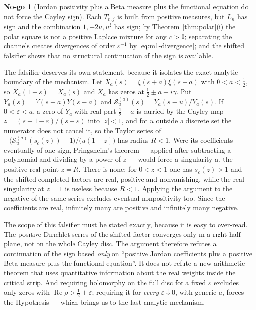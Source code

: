 \documentclass[11pt]{amsart}
\theoremstyle{definition}
\theoremstyle{remark}
\theoremstyle{definition}
\newtheorem{nogo}{No-go}[section]
\renewcommand{\Re}{\operatorname{Re}}
\newcommand{\half}{\tfrac{1}{2}}
\newcommand{\gam}{\gamma}
\newcommand{\eps}{\varepsilon}
\begin{document}
\begin{nogo}[Jordan positivity plus a Beta measure plus the functional equation do not force the
Cayley sign]\label{ng:three}
Each $T_{n,j}$ is built from positive measures, but $L_n$ has sign and the combination
$1,-2u,u^2$ has sign; by Theorem~\ref{thm:polar}(i) the polar square is not a positive Laplace
mixture for any $c>0$; separating the channels creates divergences of order $\eps^{-1}$ by
\eqref{eq:m1-divergence}; and the shifted falsifier shows that no structural continuation of the
sign is available.
\end{nogo}

\noindent The falsifier deserves its own statement, because it isolates the exact analytic
boundary of the mechanism. Let $X_a(s)=\xi(s+a)\xi(s-a)$ with $0<a<\half$, so
$X_a(1-s)=X_a(s)$ and $X_a$ has zeros at $\half\pm a+i\gam$. Put $Y_a(s)=Y(s+a)Y(s-a)$ and
$\mathcal S_u^{(a)}(s)=Y_a(s-u)/Y_a(s)$. If $0<\eps<a$, a zero of $Y_a$ with real part
$\half+a$ is carried by the Cayley map $z=(s-1-\eps)/(s-\eps)$ into $|z|<1$, and for $u$ outside a
discrete set the numerator does not cancel it, so the Taylor series of
$-\bigl(\mathcal S_u^{(a)}(s_\eps(z))-1\bigr)/\bigl(u(1-z)\bigr)$ has radius $R<1$. Were its
coefficients eventually of one sign, Pringsheim's theorem --- applied after subtracting a
polynomial and dividing by a power of $z$ --- would force a singularity at the positive real point
$z=R$. There is none: for $0<z<1$ one has $s_\eps(z)>1$ and the shifted completed factors are
real, positive and nonvanishing, while the real singularity at $z=1$ is useless because $R<1$.
Applying the argument to the negative of the same series excludes eventual nonpositivity too.
Since the coefficients are real, infinitely many are positive and infinitely many negative.

The scope of this falsifier must be stated exactly, because it is easy to over-read. The positive
Dirichlet series of the shifted factor converges only in a right half-plane, not on the whole
Cayley disc. The argument therefore refutes a continuation of the sign based \emph{only} on
``positive Jordan coefficients plus a positive Beta measure plus the functional equation''. It
does not refute a new arithmetic theorem that uses quantitative information about the real weights
inside the critical strip. And requiring holomorphy on the full disc for a fixed $\eps$ excludes
only zeros with $\Re\rho>\half+\eps$; requiring it for \emph{every} $\eps\downarrow0$, with
generic $u$, forces the Hypothesis --- which brings us to the last analytic mechanism.
\end{document}

